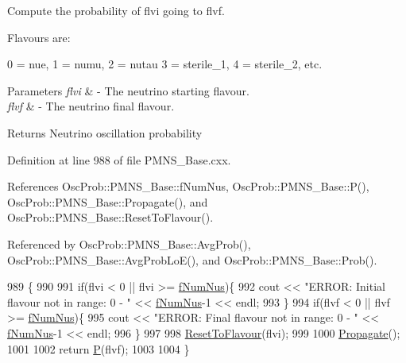 Compute the probability of flvi going to flvf.

Flavours are\+: 
\begin{DoxyPre}
  0 = nue, 1 = numu, 2 = nutau
  3 = sterile\_1, 4 = sterile\_2, etc.
\end{DoxyPre}
 
\begin{DoxyParams}{Parameters}
{\em flvi} & -\/ The neutrino starting flavour. \\
\hline
{\em flvf} & -\/ The neutrino final flavour.\\
\hline
\end{DoxyParams}
\begin{DoxyReturn}{Returns}
Neutrino oscillation probability 
\end{DoxyReturn}


Definition at line 988 of file P\+M\+N\+S\+\_\+\+Base.\+cxx.



References Osc\+Prob\+::\+P\+M\+N\+S\+\_\+\+Base\+::f\+Num\+Nus, Osc\+Prob\+::\+P\+M\+N\+S\+\_\+\+Base\+::\+P(), Osc\+Prob\+::\+P\+M\+N\+S\+\_\+\+Base\+::\+Propagate(), and Osc\+Prob\+::\+P\+M\+N\+S\+\_\+\+Base\+::\+Reset\+To\+Flavour().



Referenced by Osc\+Prob\+::\+P\+M\+N\+S\+\_\+\+Base\+::\+Avg\+Prob(), Osc\+Prob\+::\+P\+M\+N\+S\+\_\+\+Base\+::\+Avg\+Prob\+Lo\+E(), and Osc\+Prob\+::\+P\+M\+N\+S\+\_\+\+Base\+::\+Prob().


\begin{DoxyCode}
989 \{
990 
991   \textcolor{keywordflow}{if}(flvi < 0 || flvi >= \hyperlink{classOscProb_1_1PMNS__Base_a24bb74bed63569dfe88b18fa6a08060e}{fNumNus})\{
992     cout << \textcolor{stringliteral}{"ERROR: Initial flavour not in range: 0 - "} << \hyperlink{classOscProb_1_1PMNS__Base_a24bb74bed63569dfe88b18fa6a08060e}{fNumNus}-1 << endl;
993   \}
994   \textcolor{keywordflow}{if}(flvf < 0 || flvf >= \hyperlink{classOscProb_1_1PMNS__Base_a24bb74bed63569dfe88b18fa6a08060e}{fNumNus})\{
995     cout << \textcolor{stringliteral}{"ERROR: Final flavour not in range: 0 - "} << \hyperlink{classOscProb_1_1PMNS__Base_a24bb74bed63569dfe88b18fa6a08060e}{fNumNus}-1 << endl;
996   \}
997 
998   \hyperlink{classOscProb_1_1PMNS__Base_ac0d4bf8ff1318ef96d3dafa62e0cec25}{ResetToFlavour}(flvi);
999 
1000   \hyperlink{classOscProb_1_1PMNS__Base_a054e3a8b05b9a958b6fa416e4a835e3e}{Propagate}();
1001 
1002   \textcolor{keywordflow}{return} \hyperlink{classOscProb_1_1PMNS__Base_a0dc4d45bc3d7e03b9abbf5b4e100cc22}{P}(flvf);
1003 
1004 \}
\end{DoxyCode}
\mbox{\label{classOscProb_1_1PMNS__Base_aa3cee10639d5c0879ccb9e78d62128d3}} 
